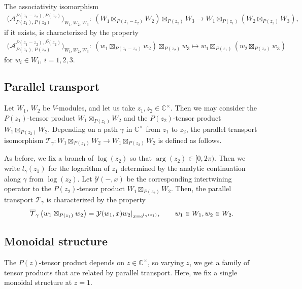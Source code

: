 \documentclass[10pt,a4paper]{amsart}
\numberwithin{equation}{section}
\newcommand{\ol}[1]{\overline{#1}}
\newcommand{\bC}{\mathbb{C}}
\newcommand{\cA}{\mathcal{A}}
\newcommand{\cT}{\mathcal{T}}
\newcommand{\voagen}{V}
\newcommand{\voamodgen}{W}
\newcommand{\voaint}{\mathcal{Y}}
\newcommand{\vmodvec}{w}
\begin{document}
The associativity isomorphism
\begin{gather*}
 \big(\cA_{P(z_{1}),P(z_{2})}^{P(z_{1}-z_{2}),P(z_{2})}\big)_{\voamodgen_{1},\voamodgen_{2},\voamodgen_{3}}\colon\
 (\voamodgen_{1}\boxtimes_{P(z_{1}-z_{2})}\voamodgen_{2})\boxtimes_{P(z_{2})}\voamodgen_{3}\to
 \voamodgen_{1}\boxtimes_{P(z_{1})}(\voamodgen_{2}\boxtimes_{P(z_{2})}\voamodgen_{3}),
\end{gather*}
if it exists, is characterized by the property
\begin{gather*}
 \ol{\big(\cA_{P(z_{1}),P(z_{2})}^{P(z_{1}-z_{2}),P(z_{2})}\big)_{\voamodgen_{1},\voamodgen_{2},\voamodgen_{3}}}\colon\
 (\vmodvec_{1}\boxtimes_{P(z_{1}-z_{2})}\vmodvec_{2})\boxtimes_{P(z_{2})}\vmodvec_{3} \mapsto
 \vmodvec_{1}\boxtimes_{P(z_{1})}(\vmodvec_{2}\boxtimes_{P(z_{2})}\vmodvec_{3})
\end{gather*}
for $\vmodvec_{i}\in \voamodgen_{i}$, $i=1,2,3$.

\subsection{Parallel transport}
Let $\voamodgen_{1}$, $\voamodgen_{2}$ be $\voagen$-modules,
and let us take $z_{1},z_{2}\in\bC^{\times}$.
Then we may consider the $P(z_{1})$-tensor product $\voamodgen_{1}\boxtimes_{P(z_{1})}\voamodgen_{2}$ and the $P(z_{2})$-tensor product $\voamodgen_{1}\boxtimes_{P(z_{2})}\voamodgen_{2}$.
Depending on a path $\gamma$ in $\bC^{\times}$ from $z_{1}$ to $z_{2}$,
the parallel transport isomorphism $\cT_{\gamma}\colon \voamodgen_{1}\boxtimes_{P(z_{1})}\voamodgen_{2}\to \voamodgen_{1}\boxtimes_{P(z_{2})}\voamodgen_{2}$ is defined as follows.


As before, we fix a branch of $\log (z_{2})$ so that $\arg (z_{2})\in [0,2\pi)$.
Then we write $l_{\gamma}(z_{1})$ for the logarithm of $z_{1}$ determined by the analytic continuation along $\gamma$ from $\log (z_{2})$.
Let $\voaint (-,x)$ be the corresponding intertwining operator to the $P(z_{2})$-tensor product $\voamodgen_{1}\boxtimes_{P(z_{2})}\voamodgen_{2}$.
Then, the parallel transport $\cT_{\gamma}$ is characterized by the property
\begin{gather*}
 \ol{\cT}_{\gamma}\left(\vmodvec_{1}\boxtimes_{P(z_{1})}\vmodvec_{2}\right)=\voaint(\vmodvec_{1},x)\vmodvec_{2}|_{x={\rm e}^{l_{\gamma}(z_{1})}},\qquad \vmodvec_{1}\in\voamodgen_{1}, \vmodvec_{2}\in\voamodgen_{2}.
\end{gather*}

\subsection{Monoidal structure}
The $P(z)$-tensor product depends on $z\in \bC^{\times}$, so varying $z$, we get a family of tensor products that are related by parallel transport.
Here, we fix a single monoidal structure at $z=1$.
\end{document}
